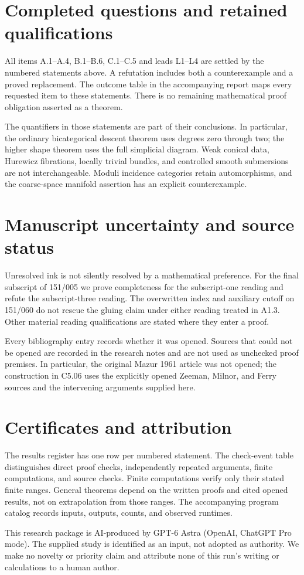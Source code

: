 \section{Completed questions and retained qualifications}
All items A.1--A.4, B.1--B.6, C.1--C.5 and leads L1--L4 are
settled by the numbered statements above. A refutation includes both a
counterexample and a proved replacement. The outcome table in the
accompanying report maps every requested item to these statements.
There is no remaining mathematical proof obligation asserted as a theorem.

The quantifiers in those statements are part of their conclusions.
In particular, the ordinary bicategorical descent theorem uses degrees
zero through two; the higher shape theorem uses the full simplicial
diagram. Weak conical data, Hurewicz fibrations, locally trivial bundles,
and controlled smooth submersions are not interchangeable. Moduli
incidence categories retain automorphisms, and the coarse-space
manifold assertion has an explicit counterexample.

\section{Manuscript uncertainty and source status}
Unresolved ink is not silently resolved by a mathematical preference.
For the final subscript of 151/005 we prove completeness for the
subscript-one reading and refute the subscript-three reading. The
overwritten index and auxiliary cutoff on 151/060 do not rescue the
gluing claim under either reading treated in A1.3. Other material
reading qualifications are stated where they enter a proof.

Every bibliography entry records whether it was opened. Sources that
could not be opened are recorded in the research notes and are not
used as unchecked proof premises. In particular, the original Mazur
1961 article was not opened; the construction in C5.06 uses the
explicitly opened Zeeman, Milnor, and Ferry sources and the intervening
arguments supplied here.

\section{Certificates and attribution}
The results register has one row per numbered statement. The check-event
table distinguishes direct proof checks, independently repeated
arguments, finite computations, and source checks. Finite computations
verify only their stated finite ranges. General theorems depend on
the written proofs and cited opened results, not on extrapolation from
those ranges. The accompanying program catalog records inputs,
outputs, counts, and observed runtimes.

This research package is AI-produced by GPT-6 Astra (OpenAI, ChatGPT Pro
mode). The supplied study is identified as an input, not adopted as
authority. We make no novelty or priority claim and attribute none of
this run's writing or calculations to a human author.
